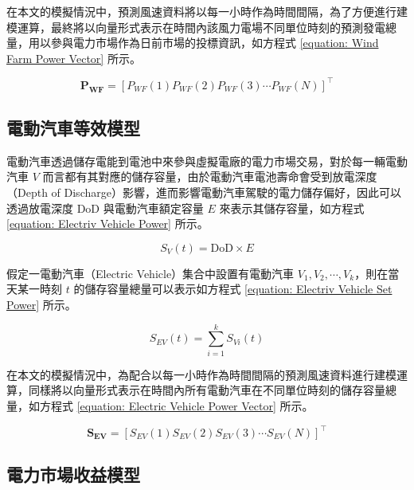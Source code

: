 在本文的模擬情況中，預測風速資料將以每一小時作為時間間隔，為了方便進行建模運算，最終將以向量形式表示在時間內該風力電場不同單位時刻的預測發電總量，用以參與電力市場作為日前市場的投標資訊，如方程式 \eqref{equation: Wind Farm Power Vector} 所示。

\begin{equation}\label{equation: Wind Farm Power Vector}
  \boldsymbol{P_{WF}} = [  P_{WF}(1) P_{WF}(2) P_{WF}(3) \cdots P_{WF}(N) ]^{\top}
\end{equation}

\subsection{電動汽車等效模型}

電動汽車透過儲存電能到電池中來參與虛擬電廠的電力市場交易，對於每一輛電動汽車 $V$ 而言都有其對應的儲存容量，由於電動汽車電池壽命會受到放電深度（Depth of Discharge）影響，進而影響電動汽車駕駛的電力儲存偏好，因此可以透過放電深度 $\text{DoD}$ 與電動汽車額定容量 $E$ 來表示其儲存容量，如方程式 \eqref{equation: Electriv Vehicle Power} 所示。

\begin{equation}\label{equation: Electriv Vehicle Power}
  S_{V} (t) = \text{DoD} \times E
\end{equation}

假定一電動汽車（Electric Vehicle）集合中設置有電動汽車 $V_{1}, V_{2}, \cdots, V_{k}$，則在當天某一時刻 $t$ 的儲存容量總量可以表示如方程式 \eqref{equation: Electriv Vehicle Set Power} 所示。

\begin{equation}\label{equation: Electriv Vehicle Set Power}
  S_{EV}(t) = \sum_{i = 1}^{k} S_{Vi} (t)
\end{equation}

在本文的模擬情況中，為配合以每一小時作為時間間隔的預測風速資料進行建模運算，同樣將以向量形式表示在時間內所有電動汽車在不同單位時刻的儲存容量總量，如方程式 \eqref{equation: Electric Vehicle Power Vector} 所示。

\begin{equation}\label{equation: Electric Vehicle Power Vector}
  \boldsymbol{S_{EV}} = [  S_{EV}(1) S_{EV}(2) S_{EV}(3) \cdots S_{EV}(N) ]^{\top}
\end{equation}

\subsection{電力市場收益模型}

